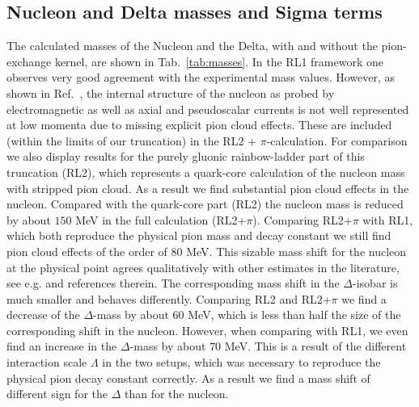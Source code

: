 \subsection{Nucleon and Delta masses and Sigma terms}

The calculated masses of the Nucleon and the Delta, with and without the 
pion-exchange kernel, are shown in Tab.~\ref{tab:masses}. In the RL1 framework
one observes very good agreement with the experimental 
mass values. However, as shown in Ref.~\cite{Eichmann:2011vu,Eichmann:2011pv}, the 
internal structure of the nucleon as probed by electromagnetic as well as axial 
and pseudoscalar currents is not well represented at low momenta due
to missing explicit pion cloud effects. These are included (within the limits of 
our truncation) in the RL2 + $\pi$-calculation. For comparison we also display 
results for the purely gluonic rainbow-ladder part of this truncation (RL2), which
represents a quark-core calculation of the nucleon mass with stripped pion cloud.
As a result we find substantial pion cloud effects in the nucleon. Compared with 
the quark-core part (RL2) the nucleon mass is reduced by about $150$ MeV in the 
full calculation (RL2+$\pi$). Comparing RL2+$\pi$ with RL1, which both reproduce
the physical pion mass and decay constant we still find pion cloud effects of the
order of $80$ MeV. This sizable mass shift for the nucleon at the physical
point agrees qualitatively with other estimates in the literature, see e.g. 
\cite{Young:2002cj} and references therein. The corresponding mass shift in the
$\Delta$-isobar is much smaller and behaves differently. Comparing RL2 and RL2+$\pi$
we find a decrease of the $\Delta$-mass by about $60$ MeV, which is less than half
the size of the corresponding shift in the nucleon. However, when comparing with
RL1, we even find an increase in the $\Delta$-mass by about $70$ MeV. This is a
result of the different interaction scale $\Lambda$ in the two setups, which
was necessary to reproduce the physical pion decay constant correctly. As a result
we find a mass shift of different sign for the $\Delta$ than for the nucleon.

